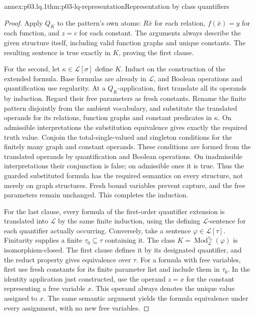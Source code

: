 \begin{annexitem}{annex:p03.lq.1}{thm:p03-lq-representation}{Representation by class quantifiers}
\begin{proof}
Apply \(Q_K\) to the pattern's own atoms: \(R\bar x\) for each
relation, \(f(\bar x)=y\) for each function, and \(z=c\) for each
constant. The arguments always describe the given structure itself,
including valid function graphs and unique constants. The resulting
sentence is true exactly in \(K\), proving the first clause.

For the second, let \(\kappa\in\mathscr L[\sigma]\) define \(K\).
Induct on the construction of the extended formula. Base formulas
are already in \(\mathscr L\), and Boolean operations and
quantification use regularity. At a \(Q_K\)-application, first
translate all its operands by induction. Regard their free parameters
as fresh constants. Rename the finite pattern disjointly from the
ambient vocabulary, and substitute the translated operands for its
relations, function graphs and constant predicates in \(\kappa\).
On admissible interpretations the substitution equivalence gives
exactly the required truth value. Conjoin the total-single-valued
and singleton conditions for the finitely many graph and constant
operands. These conditions are formed from the translated operands
by quantification and Boolean operations. On inadmissible
interpretations their conjunction is false; on admissible ones it
is true. Thus the guarded substituted formula has the required
semantics on every structure, not merely on graph structures.
Fresh bound variables prevent capture, and the free parameters
remain unchanged. This completes the induction.

For the last clause, every formula of the first-order quantifier
extension is translated into \(\mathscr L\) by the same finite
induction, using the defining \(\mathscr L\)-sentence for each
quantifier actually occurring. Conversely, take a sentence
\(\varphi\in\mathscr L[\tau]\). Finitarity supplies a finite
\(\tau_0\subseteq\tau\) containing it. The class
\(K=\operatorname{Mod}^{\tau_0}_{\mathscr L}(\varphi)\)
is isomorphism-closed. The first clause defines it by its designated
quantifier, and the reduct property gives equivalence over \(\tau\).
For a formula with free variables, first use fresh constants for its
finite parameter list and include them in \(\tau_0\). In the
identity application just constructed, use the operand \(z=x\)
for the constant representing a free variable \(x\). This operand
always denotes the unique value assigned to \(x\). The same
semantic argument yields the formula equivalence under every
assignment, with no new free variables.


\end{proof}
\end{annexitem}
